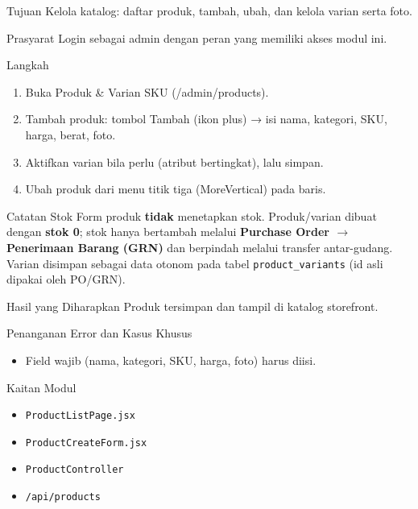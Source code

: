 
\begin{flowsection}{Tujuan}
Kelola katalog: daftar produk, tambah, ubah, dan kelola varian serta foto.
\end{flowsection}

\begin{flowsection}{Prasyarat}
Login sebagai admin dengan peran yang memiliki akses modul ini.
\end{flowsection}

\begin{flowsection}{Langkah}
\begin{enumerate}
  \item Buka Produk \&  Varian SKU (/admin/products).
  \item Tambah produk: tombol Tambah (ikon plus) → isi nama, kategori, SKU, harga, berat, foto.
  \item Aktifkan varian bila perlu (atribut bertingkat), lalu simpan.
  \item Ubah produk dari menu titik tiga (MoreVertical) pada baris.
\end{enumerate}
\end{flowsection}

\begin{flowsection}{Catatan Stok}
Form produk \textbf{tidak} menetapkan stok. Produk/varian dibuat dengan
\textbf{stok 0}; stok hanya bertambah melalui \textbf{Purchase Order $\rightarrow$
Penerimaan Barang (GRN)} dan berpindah melalui transfer antar-gudang. Varian
disimpan sebagai data otonom pada tabel \texttt{product\_variants} (id asli
dipakai oleh PO/GRN).
\end{flowsection}


\begin{flowsection}{Hasil yang Diharapkan}
Produk tersimpan dan tampil di katalog storefront.
\end{flowsection}

\begin{flowsection}{Penanganan Error dan Kasus Khusus}
\begin{itemize}
  \item Field wajib (nama, kategori, SKU, harga, foto) harus diisi.
\end{itemize}
\end{flowsection}

\begin{flowsection}{Kaitan Modul}
\begin{itemize}
  \item \texttt{ProductListPage.jsx}
  \item \texttt{ProductCreateForm.jsx}
  \item \texttt{ProductController}
  \item \texttt{/api/products}
\end{itemize}
\end{flowsection}


